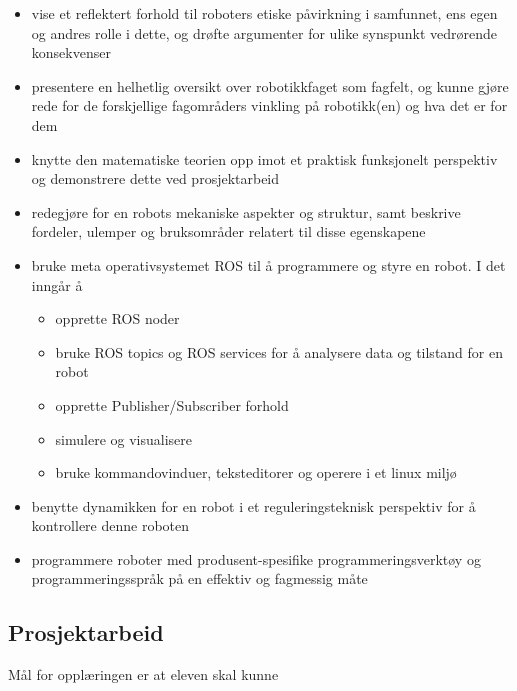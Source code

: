    \begin{itemize}
        \item vise et reflektert forhold til roboters etiske påvirkning i samfunnet, ens egen og andres rolle i dette, og drøfte argumenter for ulike synspunkt vedrørende konsekvenser
        \item presentere en helhetlig oversikt over robotikkfaget som fagfelt, og kunne gjøre rede for de forskjellige fagområders vinkling på robotikk(en) og hva det er for dem
        \item knytte den matematiske teorien opp imot et praktisk funksjonelt perspektiv og demonstrere dette ved prosjektarbeid
        \item redegjøre for en robots mekaniske aspekter og struktur, samt beskrive fordeler, ulemper og bruksområder relatert til disse egenskapene
        \item bruke meta operativsystemet ROS til å programmere og styre en robot. I det inngår å
            \begin{itemize}
                \item opprette ROS noder
                \item bruke ROS topics og ROS services for å analysere data og tilstand for en robot
                \item opprette Publisher/Subscriber forhold
                \item simulere og visualisere
                \item bruke kommandovinduer, teksteditorer og operere i et linux miljø
            \end{itemize}
        \item benytte dynamikken for en robot i et reguleringsteknisk perspektiv for å kontrollere denne roboten
        \item programmere roboter med produsent-spesifike programmeringsverktøy og programmeringsspråk på en effektiv og fagmessig måte
    \end{itemize}


\subsection*{Prosjektarbeid}

    Mål for opplæringen er at eleven skal kunne

